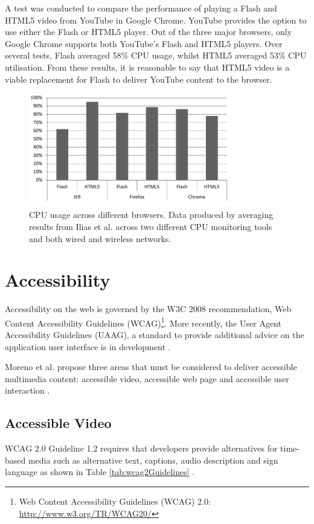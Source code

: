 \documentclass[journal]{IEEEtran}
\begin{document}
A test was conducted to compare the performance of playing a Flash and HTML5 video from YouTube in Google Chrome. YouTube provides the option to use either the Flash or HTML5 player. Out of the three major browsers, only Google Chrome supports both YouTube's Flash and HTML5 players. Over several tests, Flash averaged 58\% CPU usage, whilst HTML5 averaged 53\% CPU utilisation. From these results, it is reasonable to say that HTML5 video is a viable replacement for Flash to deliver YouTube content to the browser. 

\begin{figure}[!t]
\centering
\includegraphics[width=3.5in]{cpu-performance-graph}
\caption{CPU usage across different browsers. Data produced by averaging results from Ilias et al. \cite{inproceedings:aStudyOfVideoPerformanceAnalysis} across two different CPU monitoring tools and both wired and wireless networks.}
\label{fig:cpuPerformanceGraph}
\end{figure} 

\section{Accessibility}
Accessibility on the web is governed by the W3C 2008 recommendation, Web Content Accessibility Guidelines (WCAG)\footnote{Web Content Accessibility Guidelines (WCAG) 2.0: \url{http://www.w3.org/TR/WCAG20/}}. More recently, the User Agent Accessibility Guidelines (UAAG), a standard to provide additional advice on the application user interface is in development \cite{website:implementingUAAG}.

Moreno et al. propose three areas that must be considered to deliver accessible multimedia content: accessible video, accessible web page and accessible user interaction \cite{article:disablityStandardsForMultimediaOnTheWeb}.

\subsection{Accessible Video}
WCAG 2.0 Guideline 1.2 requires that developers provide alternatives for time-based media such as alternative text, captions, audio description and sign language as shown in Table \ref{tab:wcag2Guidelines} \cite{standard:wcag2}.
\end{document}
